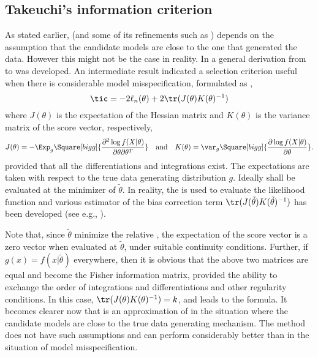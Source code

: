 \subsection{Takeuchi's information criterion}
\label{sub:Takeuchi's information criterion}

As stated earlier, \aic (and some of its refinements such as \aicc) depends on
the assumption that the candidate models are close to the one that generated
the data. However this might not be the case in reality. In
\cite{Takeuchi:1976vx} a general derivation from \kld to \aic was developed.
An intermediate result indicated a selection criterion useful when there is
considerable model misspecification, formulated as \tic,
\begin{equation}
  \tic = -2\ell_n(\theta) + 2\tr(J(\theta)K(\theta)^{-1})
  \label{eq:tic}
\end{equation}
where $J(\theta)$ is the expectation of the Hessian matrix and $K(\theta)$ is
the variance matrix of the score vector, respectively,
\begin{equation}
  J(\theta) = -\Exp_g\Square[bigg]{
    \frac{\partial^2\log f(X|\theta)}{\partial\theta\partial\theta^T}
  }\quad\text{and}\quad
  K(\theta) = \var_g\Square[bigg]{
    \frac{\partial\log f(X|\theta)}{\partial\theta}
  }.
\end{equation}
provided that all the differentiations and integrations exist. The
expectations are taken with respect to the true data generating distribution
$g$. Ideally \tic shall be evaluated at the minimizer of \kld $\tilde\theta$.
In reality, the \mle is used to evaluate the likelihood function and various
estimator of the bias correction term
$\tr(J(\tilde\theta)K(\tilde\theta)^{-1})$ has been developed (see e.g.,
\cite{Claeskens:2008tq}).

Note that, since $\tilde\theta$ minimize the relative \kld, the expectation of
the score vector is a zero vector when evaluated at $\tilde\theta$, under
suitable continuity conditions.  Further, if $g(x) = f(x|\tilde\theta)$
everywhere, then it is obvious that the above two matrices are equal and
become the Fisher information matrix, provided the ability to exchange the
order of integrations and differentiations and other regularity conditions. In
this case, $\tr(J(\theta)K(\theta)^{-1}) = k$, and \tic leads to the \aic
formula. It becomes clearer now that \aic is an approximation of \tic in the
situation where the candidate models are close to the true data generating
mechanism.  The \tic method does not have such assumptions and can perform
considerably better than \aic in the situation of model misspecification.

